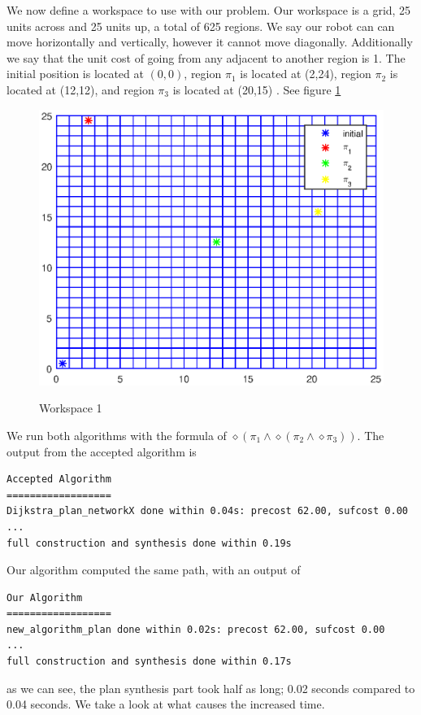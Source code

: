We now define a workspace to use with our problem. Our workspace is a grid, 25 units across and 25 units up, a total of 625 regions. We say our robot can can move horizontally and vertically, however it cannot move diagonally. Additionally we say that the unit cost of going from any adjacent to another region is 1. The initial position is located at $(0,0)$, region $\pi_1$ is located at (2,24), region $\pi_2$ is located at (12,12), and region $\pi_3$ is located at (20,15) . See figure \ref{fig:workspace}

\begin{figure}[!htb]
\centering
\includegraphics[scale=1]{workspace.eps}
\label{fig:workspace}
\caption{Workspace 1}
\end{figure}

We run both algorithms with the formula of $\diamond (\pi_1 \land \diamond(\pi_2 \land \diamond \pi_3))$. The output from the accepted algorithm is
\begingroup
\fontsize{9pt}{12pt}\selectfont
\begin{lstlisting}
Accepted Algorithm
==================
Dijkstra_plan_networkX done within 0.04s: precost 62.00, sufcost 0.00
...
full construction and synthesis done within 0.19s 
\end{lstlisting}
\endgroup
Our algorithm computed the same path, with an output of

\begin{lstlisting}
Our Algorithm
==================
new_algorithm_plan done within 0.02s: precost 62.00, sufcost 0.00
...
full construction and synthesis done within 0.17s 
\end{lstlisting}
as we can see, the plan synthesis part took half as long; 0.02 seconds compared to 0.04 seconds. We take a look at what causes the increased time. 

